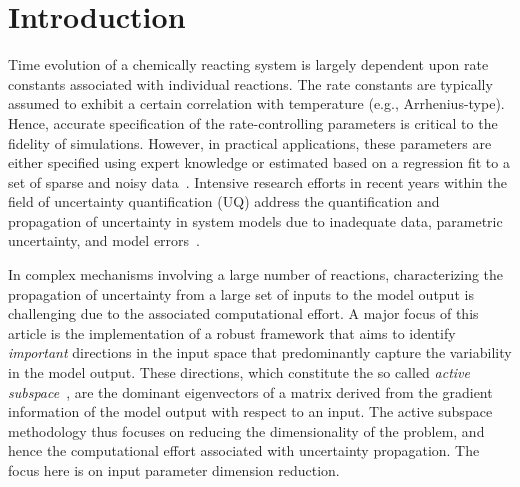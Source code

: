 \section{Introduction}
\label{sec:intro}


Time evolution of a chemically reacting system is largely dependent upon rate
constants associated with individual reactions. The rate constants are
typically assumed to exhibit a certain correlation with temperature (e.g.,
Arrhenius-type). Hence, accurate specification of the rate-controlling
parameters is critical to the fidelity of simulations. However, in practical
applications, these parameters are either specified using expert knowledge or
estimated based on a regression fit to a set of sparse and noisy
data~\cite{Burnham:1987, Burnham:1988, Vohra:2011, Sarathy:2012}.
Intensive research efforts in recent years within the field of uncertainty quantification (UQ)
address the quantification and propagation of uncertainty in system models due to 
inadequate data, parametric uncertainty, and model errors~\cite{Vohra:2014, 
Vohra:2017, Morrison:2018, Hantouche:2018, Nannapaneni:2016, Sankararaman:2015,
Reagana:2003}. 

In complex mechanisms involving a large number of reactions, characterizing the
propagation of uncertainty from a large set of inputs to the model output is
challenging due to the associated computational effort.  A major focus of this
article is the implementation of a robust framework that aims to identify
\emph{important} directions in the input space that predominantly capture the
variability in the model output. These directions, which constitute the so called
\emph{active subspace}~\cite{Constantine:2015}, are the dominant eigenvectors
of a matrix derived from the gradient information of the model output with
respect to an input. The active subspace methodology thus focuses on reducing
the dimensionality of the problem, and hence the computational effort
associated with uncertainty propagation. The focus here is on input parameter
dimension reduction. 

